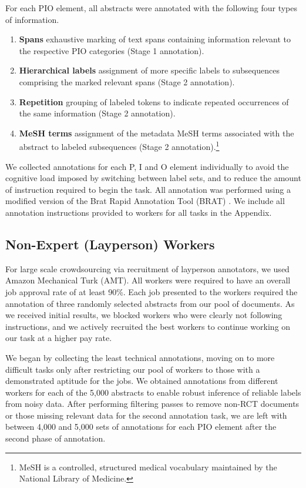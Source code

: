 \documentclass[11pt,a4paper]{article}
\begin{document}
For each PIO element, all abstracts were annotated with the following four types of information.
\begin{enumerate}
\item \textbf{Spans} exhaustive marking of text spans containing information relevant to the respective PIO categories (Stage 1 annotation).
\item \textbf{Hierarchical labels} assignment of more specific labels to subsequences comprising the marked relevant spans (Stage 2 annotation).
\item \textbf{Repetition} grouping of labeled tokens to indicate repeated occurrences of the same information (Stage 2 annotation).
\item \textbf{MeSH terms} assignment of the metadata MeSH terms associated with the abstract to labeled subsequences (Stage 2 annotation).\footnote{MeSH is a controlled, structured medical vocabulary maintained by the National Library of Medicine.}   \end{enumerate}


We collected annotations for each P, I and O element individually to avoid the cognitive load imposed by switching between label sets, and to reduce the amount of instruction required to begin the task. All annotation was performed using a modified version of the Brat Rapid Annotation Tool (BRAT) \citep{stenetorp2012brat}. We include all annotation instructions provided to workers for all tasks in the Appendix.




\subsection{Non-Expert (Layperson) Workers}

For large scale crowdsourcing via recruitment of layperson annotators, we used Amazon Mechanical Turk (AMT). All workers were required to have an overall job approval rate of at least 90\%. Each job presented to the workers required the annotation of three randomly selected abstracts from our pool of documents. As we received initial results, we blocked workers who were clearly not following instructions, and we actively recruited the best workers to continue working on our task at a higher pay rate. 

We began by collecting the least technical annotations, moving on to more difficult tasks only after restricting our pool of workers to those with a demonstrated aptitude for the jobs. We obtained annotations from  different workers for each of the 5,000 abstracts to enable robust inference of reliable labels from noisy data. After performing filtering passes to remove non-RCT documents or those missing relevant data for the second annotation task, we are left with between 4,000 and 5,000 sets of annotations for each PIO element after the second phase of annotation. 
\end{document}
